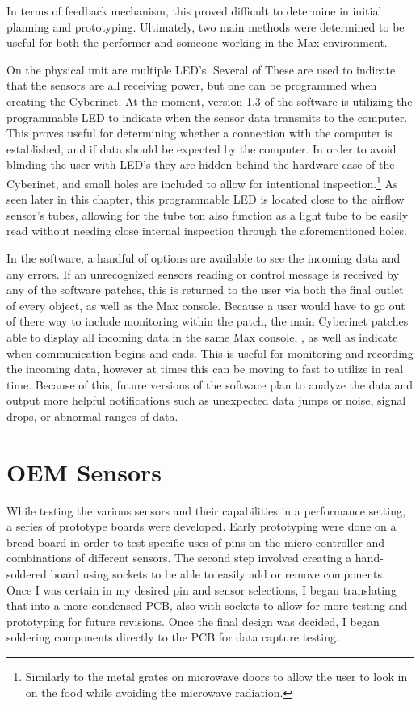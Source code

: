 In terms of feedback mechanism, this proved difficult to determine in initial planning and prototyping. Ultimately, two main methods were determined to be useful for both the performer and someone working in the Max environment.

On the physical unit are multiple LED's. Several of These are used to indicate that the sensors are all receiving power, but one can be programmed when creating the Cyberinet. At the moment, version 1.3 of the software is utilizing the programmable LED to indicate when the sensor data transmits to the computer. This proves useful for determining whether a connection with the computer is established, and if data should be expected by the computer. In order to avoid blinding the user with LED's they are hidden behind the hardware case of the Cyberinet, and small holes are included to allow for intentional inspection.\footnote{Similarly to the metal grates on microwave doors to allow the user to look in on the food while avoiding the microwave radiation.} As seen later in this chapter, this programmable LED is located close to the airflow sensor's tubes, allowing for the tube ton also function as a light tube to be easily read without needing close internal inspection through the aforementioned holes.

In the software, a handful of options are available to see the incoming data and any errors. If an unrecognized sensors reading or control message is received by any of the software patches, this is returned to the user via both the final outlet of every object, as well as the Max console. Because a user would have to go out of there way to include monitoring within the patch, the main Cyberinet patches able to display all incoming data in the same Max console, , as well as indicate when communication begins and ends. This is useful for monitoring and recording the incoming data, however at times this can be moving to fast to utilize in real time. Because of this, future versions of the software plan to analyze the data and output more helpful notifications such as unexpected data jumps or noise, signal drops, or abnormal ranges of data.





\section{OEM Sensors}
While testing the various sensors and their capabilities in a performance setting, a series of prototype boards were developed. Early prototyping were done on a bread board in order to test specific uses of pins on the micro-controller and combinations of different sensors. The second step involved creating a hand-soldered board using sockets to be able to easily add or remove components. Once I was certain in my desired pin and sensor selections, I began translating that into a more condensed PCB, also with sockets to allow for more testing and prototyping for future revisions. Once the final design was decided, I began soldering components directly to the PCB for data capture testing.


